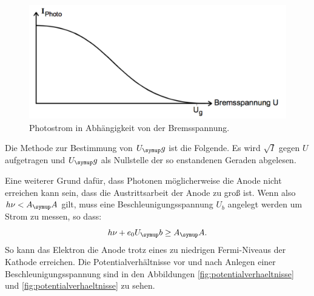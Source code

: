 \begin{figure}[H]
  \centering
  \includegraphics[height = 5cm]{NacktbilderMilaKunis/bremsspannung.pdf}
  \caption{Photostrom in Abhängigkeit von der Bremsspannung\cite{anleitung}.}
  \label{fig:bremsspannung}
\end{figure}

Die Methode zur Bestimmung von $U_\g{g}$ ist die Folgende.
Es wird $\sqrt{I}$ gegen $U$ aufgetragen und $U_\g{g}$ als
Nullstelle der so enstandenen Geraden abgelesen.

Eine weiterer Grund dafür, dass Photonen möglicherweise die Anode nicht erreichen
kann sein, dass die Austrittsarbeit der Anode zu groß ist.
Wenn also $h \nu < A_\g{A}$
gilt, muss eine Beschleunigungsspannung $U_b$ angelegt werden um Strom zu messen, so dass:
\begin{equation*}
  h \nu + e_0 U_\g{b} \geq A_\g{A}.
\end{equation*}
So kann das Elektron die Anode trotz eines zu niedrigen Fermi-Niveaus der Kathode
erreichen. Die Potentialverhältnisse vor und nach Anlegen einer
Beschleunigungsspannung sind in den Abbildungen \ref{fig:potentialverhaeltnisse}
und \ref{fig:potentialverhaeltnisse} zu sehen.

